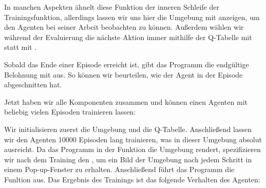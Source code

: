 



\medskip

In manchen Aspekten ähnelt diese Funktion der inneren Schleife der Trainingsfunktion, allerdings lassen wir uns hier die Umgebung mit  anzeigen, um den Agenten bei seiner Arbeit beobachten zu können. Außerdem wählen wir während der Evaluierung die nächste Aktion immer mithilfe der Q-Tabelle mit  statt mit .

Sobald das Ende einer Episode erreicht ist, gibt das Programm die endgültige Belohnung mit  aus. So können wir beurteilen, wie der Agent in der Episode abgeschnitten hat.

Jetzt haben wir alle Komponenten zusammen und können einen Agenten mit beliebig vielen Episoden trainieren lassen:

\medskip






\PYTHON{}


\PYTHON{}



\medskip

Wir initialisieren zuerst die Umgebung und die Q-Tabelle. Anschließend lassen wir den Agenten 10000 Episoden lang trainieren, was in dieser Umgebung absolut ausreicht. Da das Programm in der Funktion  die Umgebung rendert, spezifizieren wir nach dem Training den , um ein Bild der Umgebung nach jedem Schritt in einem Pop-up-Fenster zu erhalten. Anschließend führt das Programm die Funltion  aus. Das Ergebnis des Trainings ist das folgende Verhalten des Agenten:


